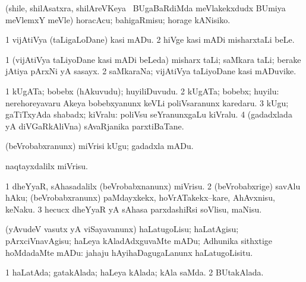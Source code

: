 \bentry
{}
\gl{\akirx}
\bmng
(shile, shilAsatxra, shilAreVKeya \vi\ BUgaBaRdiMda meVlakekxdudx BUmiya meVlemxY meVle) horacAcu; bahigaRmisu; horage kANisiko. 
\emng
\eentry

\bentry
{}
\gl{\sakirx}
\bmng
\bnum
\num{1} vijAtiVya (taLigaLoDane) kasi mADu. 
\num{2} hiVge kasi mADi misharxtaLi beLe. 
\enum
\emng
\eentry

\bentry
{}
\gl{\nA}
\bmng
\bnum
\num{1} (vijAtiVya taLiyoDane kasi mADi beLeda) misharx taLi; saMkara taLi; berake jAtiya pArxNi yA sasayx. 
\num{2} saMkaraNa; vijAtiVya taLiyoDane kasi mADuvike. 
\enum
\emng
\eentry

\bentry
{}
\gl{\nA}
\bmng
\bnum
\num{1} kUgATa; bobebx (hAkuvudu); huyiliDuvudu. 
\num{2} kUgATa; bobebx; huyilu:  nerehoreyavaru Akeya bobebxyanunx keVLi poliVsaranunx karedaru. 
\num{3} kUgu; gaTiTxyAda shabadx; kiVralu:  poliVsu seYranunxgaLu kiVralu. 
\num{4} (gadadxlada yA diVGaRkAliVna) sAvaRjanika parxtiBaTane. 
\enum
\emng
\eentry

\bentry
{}
\gl{\sakirx}
\bmng
(beVrobabxranunx) miVrisi kUgu; gadadxla mADu. 
\emng
\eentry

\bentry
{}
\gl{\sakirx}
\bmng
naqtayxdalilx miVrisu. 
\emng
\eentry

\bentry
{}
\gl{\sakirx}
\bmng
\bnum
\num{1} dheYyaR, sAhasadalilx (beVrobabxnanunx) miVrisu. 
\num{2} (beVrobabxrige) savAlu hAku; (beVrobabxranunx) paMdayxkekx, hoVrATakekx--kare, AhAvxnisu, keNaku. 
\num{3} hecucx dheYyaR yA sAhasa parxdashiRsi soVlisu, maNisu. 
\enum
\emng
\eentry

\bentry
{}
\gl{\sakirx}
\bmng
(yAvudeV vasutx yA viSayavanunx) haLatugoLisu; haLatAgisu; pArxciVnavAgisu; haLeya kAladAdxguvaMte mADu; Adhunika sithxtige hoMdadaMte mADu:  ja{ha}ju hAyihaDagugaLanunx haLatugoLisitu. 
\emng
\eentry

\bentry
{}
\gl{\gu}
\bmng
\bnum
\num{1} haLatAda; gatakAlada; haLeya kAlada; kAla saMda. 
\num{2} BUtakAlada. 
\enum
\emng
\eentry

